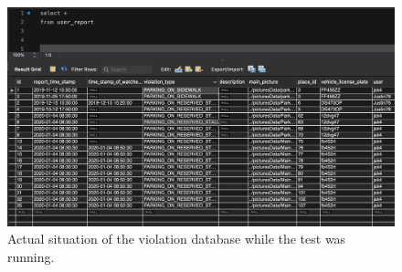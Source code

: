 \documentclass[../ATD.tex]{subfiles}
\begin{document}
    \begin{figure}[H]
        \centering
        \includegraphics[scale = 0.5]{assets/database_user_report.png}
        \caption[Situation of the database]{Actual situation of the violation database while the test was running.}
    \end{figure}
\end{document}
